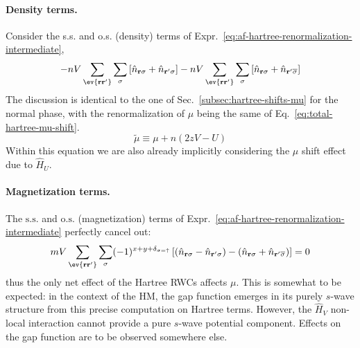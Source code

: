 \paragraph{Density terms.}

Consider the s.s. and o.s. (density) terms of Expr.~\eqref{eq:af-hartree-renormalization-intermediate},
\begin{equation}\label{eq:af-hartree-renormalization-density}
	-nV \sum_{\ev{\mathbf{r}\mathbf{r}'}} \sum_\sigma \left[
	\hat n_{\mathbf{r}\sigma} + \hat n_{\mathbf{r}'\sigma}
	\right] -nV \sum_{\ev{\mathbf{r}\mathbf{r}'}} \sum_\sigma \left[
	\hat n_{\mathbf{r}\sigma} + \hat n_{\mathbf{r}'\overline{\sigma}}
	\right]
\end{equation}
The discussion is identical to the one of Sec.~\ref{subsec:hartree-shifts-mu} for the normal phase, with the renormalization of $\mu$ being the same of Eq.~\eqref{eq:total-hartree-mu-shift}.
\begin{equation}\label{eq:af-hartree-chemical-potential-renormalization}
	\tilde{\mu} \equiv \mu + n(2zV-U)
\end{equation}
Within this equation we are also already implicitly considering the $\mu$ shift effect due to $\hat H_U$.

\paragraph{Magnetization terms.}

The $\mathrm{s.s.}$ and $\mathrm{o.s.}$ (magnetization) terms of Expr.~\eqref{eq:af-hartree-renormalization-intermediate} perfectly cancel out:
\[
	mV \sum_{\ev{\mathbf{r}\mathbf{r}'}} \sum_\sigma (-1)^{x+y+\delta_{\sigma=\uparrow}} \left[
		\left(
			\hat n_{\mathbf{r}\sigma} - \hat n_{\mathbf{r}'\sigma}
		\right) - \left(
			\hat n_{\mathbf{r}\sigma} + \hat n_{\mathbf{r}'\overline{\sigma}}
		\right)
	\right] = 0
\]
thus the only net effect of the Hartree RWCs affects $\mu$. This is somewhat to be expected: in the context of the HM, the gap function emerges in its purely $s$-wave structure from this precise computation on Hartree terms. However, the $\hat H_V$ non-local interaction cannot provide a pure $s$-wave potential component. Effects on the gap function are to be observed somewhere else.

